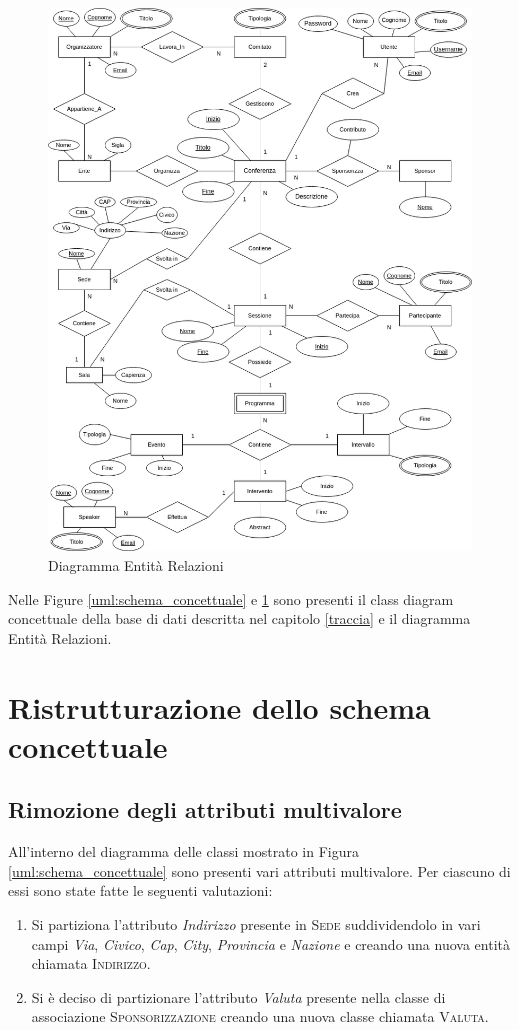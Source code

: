 \begin{figure}[h!]
	\centering
	\includegraphics[scale=0.6]{Immagini/DiagrammaER.png}
	\caption{Diagramma Entità Relazioni}\label{er:concettuale}
\end{figure}
Nelle Figure \ref{uml:schema_concettuale} e \ref{er:concettuale} sono presenti il class diagram concettuale della base di dati descritta nel capitolo \ref{traccia} e il diagramma Entità Relazioni.

\section{Ristrutturazione dello schema concettuale}

\subsection{Rimozione degli attributi multivalore}All'interno del diagramma delle classi mostrato in Figura \ref{uml:schema_concettuale} sono presenti vari attributi multivalore. Per ciascuno di essi sono state fatte le seguenti valutazioni:
\begin{enumerate}
	\item Si partiziona l'attributo \textit{Indirizzo} presente in \textsc{Sede} suddividendolo in vari campi \textit{Via}, \textit{Civico}, \textit{Cap}, \textit{City}, \textit{Provincia} e \textit{Nazione} e creando una nuova entità chiamata \textsc{Indirizzo}.
	\item Si è deciso di partizionare l'attributo \textit{Valuta} presente nella classe di associazione \textsc{Sponsorizzazione} creando una nuova classe chiamata \textsc{Valuta}.
\end{enumerate}
